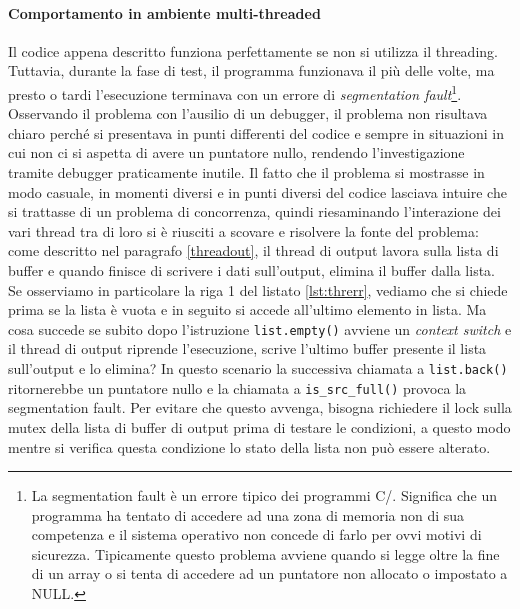 \paragraph{Comportamento in ambiente multi-threaded}
Il codice appena descritto funziona perfettamente se non si utilizza il
threading. Tuttavia, durante la fase di test, il programma funzionava il pi\`u
delle volte, ma presto o tardi l'esecuzione terminava con un errore di
\emph{segmentation fault}\footnote{La segmentation fault \`e un errore tipico
    dei programmi C/\CC. Significa che un programma ha tentato di accedere ad
    una zona di memoria non di sua competenza e il sistema operativo non
    concede di farlo per ovvi motivi di sicurezza. Tipicamente questo problema
    avviene quando si legge oltre la fine di un array o si tenta di accedere ad
    un puntatore non allocato o impostato a NULL.}.
Osservando il problema con l'ausilio di un debugger, il problema non risultava
chiaro perch\'e si presentava in punti differenti del codice e sempre in
situazioni in cui non ci si aspetta di avere un puntatore nullo, rendendo
l'investigazione tramite debugger praticamente inutile. Il fatto che il problema
si mostrasse in modo casuale, in momenti diversi e in punti diversi del codice
lasciava intuire che si trattasse di un problema di concorrenza, quindi
riesaminando l'interazione dei vari thread tra di loro si \`e riusciti a scovare
e risolvere la fonte del problema:  come descritto nel paragrafo
\ref{threadout}, il thread di output lavora sulla lista di buffer e quando
finisce di scrivere i dati sull'output, elimina il buffer dalla lista. Se
osserviamo in particolare la riga 1 del listato \ref{lst:threrr}, vediamo che si
chiede prima se la lista \`e vuota e in seguito si accede all'ultimo elemento in
lista. Ma cosa succede se subito dopo l'istruzione \texttt{list.empty()} avviene
un \emph{context switch} e il thread di output riprende l'esecuzione, scrive
l'ultimo buffer presente il lista sull'output e lo elimina? In questo scenario
la successiva chiamata a \texttt{list.back()} ritornerebbe un puntatore nullo e
la chiamata a \texttt{is\_src\_full()} provoca la segmentation fault. Per
evitare che questo avvenga, bisogna richiedere il lock sulla mutex della lista
di buffer di output prima di testare le condizioni, a questo modo mentre si
verifica questa condizione lo stato della lista non pu\`o essere alterato.

